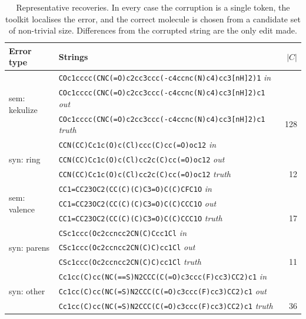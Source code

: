\begin{table}[t]
\centering\small
\caption{Representative recoveries. In every case the corruption is a single token, the toolkit localises the error, and the correct molecule is chosen from a candidate set of non-trivial size. Differences from the corrupted string are the only edit made.}
\label{tab:examples}
\begin{tabular}{@{}p{2.1cm}p{9.6cm}r@{}}
\toprule
Error type & Strings & $|C|$ \\
\midrule
\multirow{3}{*}{sem: kekulize} & \texttt{\footnotesize COc1cccc(CNC(=O)c2cc3ccc(-c4ccnc(N)c4)cc3[nH]2)1} \hfill\textit{\scriptsize in} \\
 & \texttt{\footnotesize COc1cccc(CNC(=O)c2cc3ccc(-c4ccnc(N)c4)cc3[nH]2)c1} \hfill\textit{\scriptsize out} \\
 & \texttt{\footnotesize COc1cccc(CNC(=O)c2cc3ccc(-c4ccnc(N)c4)cc3[nH]2)c1} \hfill\textit{\scriptsize truth} & 128 \\[2pt]
\multirow{3}{*}{syn: ring} & \texttt{\footnotesize CCN(CC)Cc1c(O)c(Cl)ccc(C)cc(=O)oc12} \hfill\textit{\scriptsize in} \\
 & \texttt{\footnotesize CCN(CC)Cc1c(O)c(Cl)cc2c(C)cc(=O)oc12} \hfill\textit{\scriptsize out} \\
 & \texttt{\footnotesize CCN(CC)Cc1c(O)c(Cl)cc2c(C)cc(=O)oc12} \hfill\textit{\scriptsize truth} & 12 \\[2pt]
\multirow{3}{*}{sem: valence} & \texttt{\footnotesize CC1=CC23OC2(CC(C)(C)C3=O)C(C)CFC1O} \hfill\textit{\scriptsize in} \\
 & \texttt{\footnotesize CC1=CC23OC2(CC(C)(C)C3=O)C(C)CCC1O} \hfill\textit{\scriptsize out} \\
 & \texttt{\footnotesize CC1=CC23OC2(CC(C)(C)C3=O)C(C)CCC1O} \hfill\textit{\scriptsize truth} & 17 \\[2pt]
\multirow{3}{*}{syn: parens} & \texttt{\footnotesize CSc1ccc(Oc2ccncc2CN(C)Ccc1Cl} \hfill\textit{\scriptsize in} \\
 & \texttt{\footnotesize CSc1ccc(Oc2ccncc2CN(C)C)cc1Cl} \hfill\textit{\scriptsize out} \\
 & \texttt{\footnotesize CSc1ccc(Oc2ccncc2CN(C)C)cc1Cl} \hfill\textit{\scriptsize truth} & 11 \\[2pt]
\multirow{3}{*}{syn: other} & \texttt{\footnotesize Cc1cc(C)cc(NC(==S)N2CCC(C(=O)c3ccc(F)cc3)CC2)c1} \hfill\textit{\scriptsize in} \\
 & \texttt{\footnotesize Cc1cc(C)cc(NC(=S)N2CCC(C(=O)c3ccc(F)cc3)CC2)c1} \hfill\textit{\scriptsize out} \\
 & \texttt{\footnotesize Cc1cc(C)cc(NC(=S)N2CCC(C(=O)c3ccc(F)cc3)CC2)c1} \hfill\textit{\scriptsize truth} & 36 \\
\bottomrule
\end{tabular}
\end{table}
